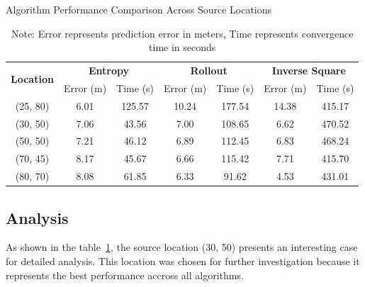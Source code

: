 \documentclass[../report.tex]{subfiles}
\begin{document}
    \begin{table}[htbp]
        \centering
        \caption{Algorithm Performance Comparison Across Source Locations}
        \label{tab:algorithm_comparison}
        \setlength{\tabcolsep}{4pt}  %
        \begin{tabular}{|c|cc|cc|cc|}
                \hline
                \multirow{2}{*}{\textbf{Location}} & \multicolumn{2}{c|}{\textbf{Entropy}} & \multicolumn{2}{c|}{\textbf{Rollout}} & \multicolumn{2}{c|}{\textbf{Inverse Square}} \\
                \cline{2-7}
                & Error (m) & Time (s) & Error (m) & Time (s) & Error (m) & Time (s) \\
                \hline
                (25, 80) & 6.01 & 125.57 & 10.24 & 177.54 & 14.38 & 415.17 \\
                \rowcolor{gray!20}
                (30, 50) & 7.06 & 43.56 & 7.00 & 108.65 & 6.62 & 470.52 \\
                (50, 50) & 7.21 & 46.12 & 6.89 & 112.45 & 6.83 & 468.24 \\
                (70, 45) & 8.17 & 45.67 & 6.66 & 115.42 & 7.71 & 415.70 \\
                (80, 70) & 8.08 & 61.85 & 6.33 & 91.62 & 4.53 & 431.01 \\
                \hline
            \end{tabular}
            \caption*{Note: Error represents prediction error in meters, Time represents convergence time in seconds}
        \end{table}
    \subsection{Analysis}

    As shown in the table~\ref{tab:algorithm_comparison}, the source location (30, 50) presents an interesting case for detailed analysis. This location was chosen for further 
    investigation because it represents the best performance accross all algorithms. 
    
    
    
\end{document}
